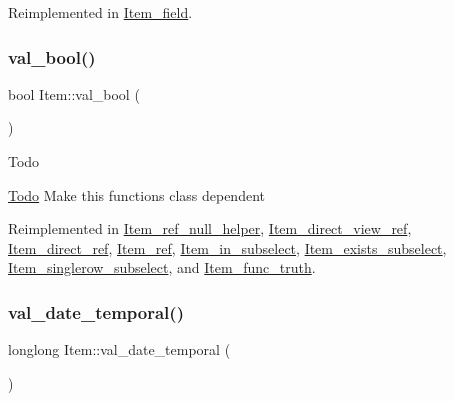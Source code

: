 Reimplemented in \mbox{\hyperlink{classItem__field_a29900919e790061d19f828b4baf5fc25}{Item\+\_\+field}}.

\mbox{\label{classItem_a875594d2b9d99ccff3863bfd435828f0}} 
\subsubsection{\texorpdfstring{val\+\_\+bool()}{val\_bool()}}
{\footnotesize\ttfamily bool Item\+::val\+\_\+bool (\begin{DoxyParamCaption}{ }\end{DoxyParamCaption})\hspace{0.3cm}{\ttfamily [virtual]}}

\begin{DoxyRefDesc}{Todo}
\item[\mbox{\hyperlink{todo__todo000026}{Todo}}]Make this functions class dependent \end{DoxyRefDesc}


Reimplemented in \mbox{\hyperlink{classItem__ref__null__helper_ae2f622d4bb13a40800c5293c07f56334}{Item\+\_\+ref\+\_\+null\+\_\+helper}}, \mbox{\hyperlink{classItem__direct__view__ref_addadee858f933ad08e2bb3bb533067f3}{Item\+\_\+direct\+\_\+view\+\_\+ref}}, \mbox{\hyperlink{classItem__direct__ref_ae552bb7da0a5629c75850d6d0e07d344}{Item\+\_\+direct\+\_\+ref}}, \mbox{\hyperlink{classItem__ref_af6730f5fe99b99c653a6fa1a66e8cf89}{Item\+\_\+ref}}, \mbox{\hyperlink{classItem__in__subselect_a137eef270a78238c1bafde29071cbbcb}{Item\+\_\+in\+\_\+subselect}}, \mbox{\hyperlink{classItem__exists__subselect_a2ca1dbb0f70d442c43e5360933a5a44d}{Item\+\_\+exists\+\_\+subselect}}, \mbox{\hyperlink{classItem__singlerow__subselect_a9e8de5972977f88a0354b36a05862a68}{Item\+\_\+singlerow\+\_\+subselect}}, and \mbox{\hyperlink{classItem__func__truth_a1c0f8cdf192cec99a3e0b5eafa1845bf}{Item\+\_\+func\+\_\+truth}}.

\mbox{\label{classItem_a9174217a46706eb2db74689b5365c4a5}} 
\subsubsection{\texorpdfstring{val\+\_\+date\+\_\+temporal()}{val\_date\_temporal()}}
{\footnotesize\ttfamily longlong Item\+::val\+\_\+date\+\_\+temporal (\begin{DoxyParamCaption}{ }\end{DoxyParamCaption})\hspace{0.3cm}{\ttfamily [virtual]}}

